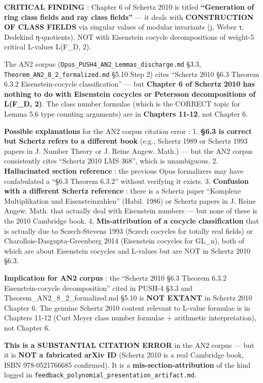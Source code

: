 \documentclass[
  11pt,
  a4paper,
]{article}
\begin{document}
\textbf{CRITICAL FINDING} : Chapter 6 of Schertz 2010 is titled \textbf{``Generation of ring class fields and ray class fields''} --- it deals with \textbf{CONSTRUCTION OF CLASS FIELDS} via singular values of modular invariants (j, Weber τ, Dedekind η-quotients), NOT with Eisenstein cocycle decompositions of weight-5 critical L-values L(F\_D, 2).

The AN2 corpus (\texttt{Opus\_PUSH4\_AN2\_Lemmas\_discharge.md} §3.3, \texttt{Theorem\_AN2\_8\_2\_formalized.md} §5.10 Step 2) cites ``Schertz 2010 §6.3 Theorem 6.3.2 Eisenstein-cocycle classification'' --- but \textbf{Chapter 6 of Schertz 2010 has nothing to do with Eisenstein cocycles or Petersson decompositions of L(F\_D, 2)}. The class number formulae (which is the CORRECT topic for Lemma 5.6 type counting arguments) are in \textbf{Chapters 11-12}, not Chapter 6.

\textbf{Possible explanations} for the AN2 corpus citation error :
1. \textbf{§6.3 is correct but Schertz refers to a different book} (e.g., Schertz 1989 or Schertz 1993 papers in J. Number Theory or J. Reine Angew. Math.) --- but the AN2 corpus consistently cites ``Schertz 2010 LMS 368'', which is unambiguous.
2. \textbf{Hallucinated section reference} : the previous Opus formalizers may have confabulated a ``§6.3 Theorem 6.3.2'' without verifying it exists.
3. \textbf{Confusion with a different Schertz reference} : there is a Schertz paper ``Komplexe Multiplikation und Eisensteinzahlen'' (Habil. 1986) or Schertz papers in J. Reine Angew. Math. that actually deal with Eisenstein numbers --- but none of these is the 2010 Cambridge book.
4. \textbf{Mis-attribution of a cocycle classification} that is actually due to Sczech-Stevens 1993 (Sczech cocycles for totally real fields) or Charollois-Dasgupta-Greenberg 2014 (Eisenstein cocycles for GL\_n), both of which are about Eisenstein cocycles and L-values but are NOT in Schertz 2010 §6.3.

\textbf{Implication for AN2 corpus} : the ``Schertz 2010 §6.3 Theorem 6.3.2 Eisenstein-cocycle decomposition'' cited in PUSH-4 §3.3 and Theorem\_AN2\_8\_2\_formalized.md §5.10 is \textbf{NOT EXTANT} in Schertz 2010 Chapter 6. The genuine Schertz 2010 content relevant to L-value formulae is in Chapters 11-12 (Curt Meyer class number formulae + arithmetic interpretation), not Chapter 6.

\textbf{This is a SUBSTANTIAL CITATION ERROR} in the AN2 corpus --- but it is \textbf{NOT a fabricated arXiv ID} (Schertz 2010 is a real Cambridge book, ISBN 978-0521766685 confirmed). It is a \textbf{mis-section-attribution} of the kind logged in \texttt{feedback\_polynomial\_presentation\_artifact.md}.
\end{document}
